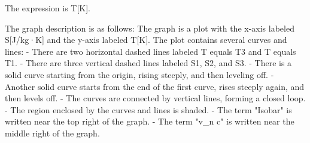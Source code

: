 The expression is T[K].

The graph description is as follows: The graph is a plot with the x-axis labeled S[J/kg·K] and the y-axis labeled T[K]. The plot contains several curves and lines:
- There are two horizontal dashed lines labeled T equals T3 and T equals T1.
- There are three vertical dashed lines labeled S1, S2, and S3.
- There is a solid curve starting from the origin, rising steeply, and then leveling off.
- Another solid curve starts from the end of the first curve, rises steeply again, and then levels off.
- The curves are connected by vertical lines, forming a closed loop.
- The region enclosed by the curves and lines is shaded.
- The term "Isobar" is written near the top right of the graph.
- The term "v_n c" is written near the middle right of the graph.